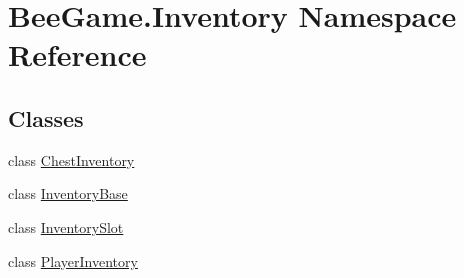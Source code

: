 \hypertarget{namespace_bee_game_1_1_inventory}{}\section{Bee\+Game.\+Inventory Namespace Reference}
\label{namespace_bee_game_1_1_inventory}
\subsection*{Classes}
\begin{DoxyCompactItemize}
\item 
class \hyperlink{class_bee_game_1_1_inventory_1_1_chest_inventory}{Chest\+Inventory}
\item 
class \hyperlink{class_bee_game_1_1_inventory_1_1_inventory_base}{Inventory\+Base}
\item 
class \hyperlink{class_bee_game_1_1_inventory_1_1_inventory_slot}{Inventory\+Slot}
\item 
class \hyperlink{class_bee_game_1_1_inventory_1_1_player_inventory}{Player\+Inventory}
\end{DoxyCompactItemize}
